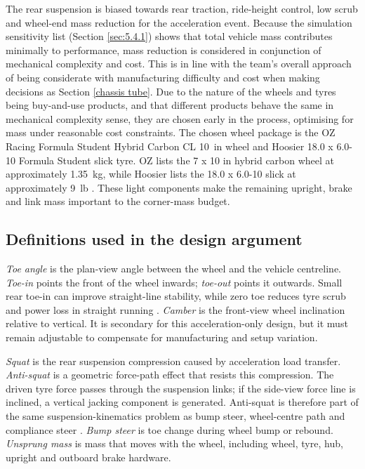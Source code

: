 The rear suspension is biased towards rear traction, ride-height control, low scrub and wheel-end mass reduction for the acceleration event. Because the simulation sensitivity list (Section \ref{sec:5.4.1}) shows that total vehicle mass contributes minimally to performance, mass reduction is considered in conjunction of mechanical complexity and cost. This is in line with the team's overall approach of being considerate with manufacturing difficulty and cost when making decisions as Section \ref{chassis tube}. Due to the nature of the wheels and tyres being buy-and-use products, and that different products behave the same in mechanical complexity sense, they are chosen early in the process, optimising for mass under reasonable cost constraints. The chosen wheel package is the OZ Racing Formula Student Hybrid Carbon CL \SI{10}{in} wheel and Hoosier 18.0 x 6.0-10 Formula Student slick tyre. OZ lists the 7 x 10 in hybrid carbon wheel at approximately \SI{1.35}{kg}, while Hoosier lists the 18.0 x 6.0-10 slick at approximately \SI{9}{lb} \parencite{zxOZCarbon10,zxHoosierSpecs}. These light components make the remaining upright, brake and link mass important to the corner-mass budget.

\subsection{Definitions used in the design argument}
\textit{Toe angle} is the plan-view angle between the wheel and the vehicle centreline. \textit{Toe-in} points the front of the wheel inwards; \textit{toe-out} points it outwards. Small rear toe-in can improve straight-line stability, while zero toe reduces tyre scrub and power loss in straight running \parencite{zxSuspensionSecretsToe}. \textit{Camber} is the front-view wheel inclination relative to vertical. It is secondary for this acceleration-only design, but it must remain adjustable to compensate for manufacturing and setup variation.

\textit{Squat} is the rear suspension compression caused by acceleration load transfer. \textit{Anti-squat} is a geometric force-path effect that resists this compression. The driven tyre force passes through the suspension links; if the side-view force line is inclined, a vertical jacking component is generated. Anti-squat is therefore part of the same suspension-kinematics problem as bump steer, wheel-centre path and compliance steer \parencite{zxMilliken1995,zxDixon2009}. \textit{Bump steer} is toe change during wheel bump or rebound. \textit{Unsprung mass} is mass that moves with the wheel, including wheel, tyre, hub, upright and outboard brake hardware.

